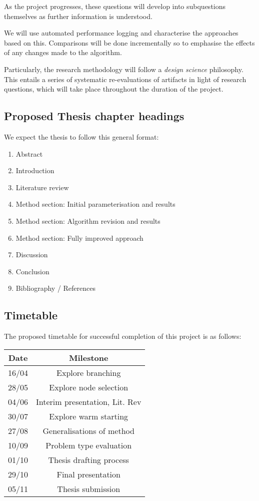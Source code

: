 \documentclass[12pt, a4paper]{article}
\begin{document}
As the project progresses, these questions will develop into subquestions themselves as further information is understood.

We will use automated performance logging and characterise the approaches based on this. Comparisons will be done incrementally so to emphasise the effects of any changes made to the algorithm.

Particularly, the research methodology will follow a \textit{design science} philosophy. This entails a series of systematic re-evaluations of artifacts in light of research questions, which will take place throughout the duration of the project. 

\subsection{Proposed Thesis chapter headings}
We expect the thesis to follow this general format:
\begin{enumerate}
  \item Abstract
  \item Introduction
  \item Literature review
  \item Method section: Initial parameterisation and results
  \item Method section: Algorithm revision and results 
  \item Method section: Fully improved approach
  \item Discussion
  \item Conclusion
  \item Bibliography / References
\end{enumerate}
\newpage
\subsection{Timetable}
The proposed timetable for successful completion of this project is as follows:

\begin{center}
  \begin{tabular}{||c | c||}
  \hline
  Date & Milestone \\ [0.5ex]
  \hline\hline
  16/04 & Explore branching \\
  \hline
  28/05 & Explore node selection \\
  \hline
  04/06 & Interim presentation, Lit. Rev  \\
  \hline
  30/07 & Explore warm starting \\
  \hline
  27/08 & Generalisations of method \\
  \hline
  10/09 & Problem type evaluation \\
  \hline
  01/10 & Thesis drafting process \\
  \hline
  29/10 & Final presentation \\
  \hline 
  05/11 & Thesis submission \\ [1ex]
  \hline
  \end{tabular}
\end{center}
\end{document}
